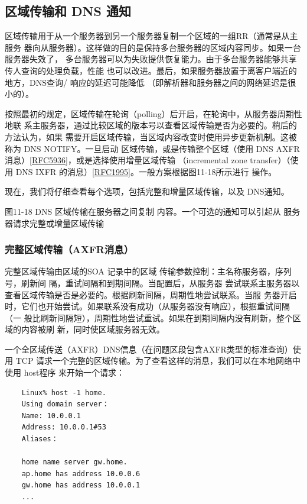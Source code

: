 \subsection{区域传输和 DNS 通知}

区域传输用于从一个服务器到另一个服务器复制一个区域的一组RR（通常是从主服务
器向从服务器）。这样做的目的是保持多台服务器的区域内容同步。如果一台服务器失效了，
多台服务器可以为失败提供恢复能力。由于多台服务器能够共享传人查询的处理负载，性能
也可以改进。最后，如果服务器放置于离客户端近的地方，DNS查询/ 响应的延迟可能降低
（即解析器和服务器之间的网络延迟是很小的）。

按照最初的规定，区域传输在轮询（polling）后开启，在轮询中，从服务器周期性地联
系主服务器，通过比较区域的版本号以查看区域传输是否为必要的。稍后的方法认为，如果
需要开启区域传输，当区域内容改变时使用异步更新机制。这被称为 DNS NOTIFY。一旦启动
区域传输，或是传输整个区域（使用 DNS
AXFR消息）\href{https://www.rfc-editor.org/rfc/rfc5936}{[RFC5936]}，或是选择使用增量区域传输
（incremental zone transfer）（使用 DNS IXFR
的消息）\href{https://www.rfc-editor.org/rfc/rfc1995}{[RFC1995]}。一般方案根据图11-18所示进行
操作。

现在，我们将仔细查看每个选项，包括完整和增量区域传输，以及 DNS通知。

图11-18
DNS 区域传输在服务器之间复制
内容。一个可选的通知可以引起从
服务器请求完整或增量区域传输

\subsubsection{完整区域传输（AXFR消息）}

完整区域传输由区域的SOA 记录中的区域
传输参数控制：主名称服务器，序列号，刷新间
隔，重试间隔和到期间隔。当配置后，从服务器
尝试联系主服务器以查看区域传输是否是必要的。根据刷新间隔，周期性地尝试联系。当服
务器开启时，它们也开始尝试。如果联系没有成功（从服务器没有响应），根据重试间隔（一
般比刷新间隔短），周期性地尝试重试。如果在到期间隔内没有刷新，整个区域的内容被刷
新，同时使区域服务器无效。

一个全区域传送（AXFR）DNS信息（在问题区段包含AXFR类型的标准查询）使用
TCP 请求一个完整的区域传输。为了查看这样的消息，我们可以在本地网络中使用 host程序
来开始一个请求：

\begin{verbatim}
    Linux% host -1 home.
    Using domain server：
    Name: 10.0.0.1
    Address: 10.0.0.1#53
    Aliases：

    home name server gw.home.
    ap.home has address 10.0.0.6
    gw.home has address 10.0.0.1
    ...
\end{verbatim}


